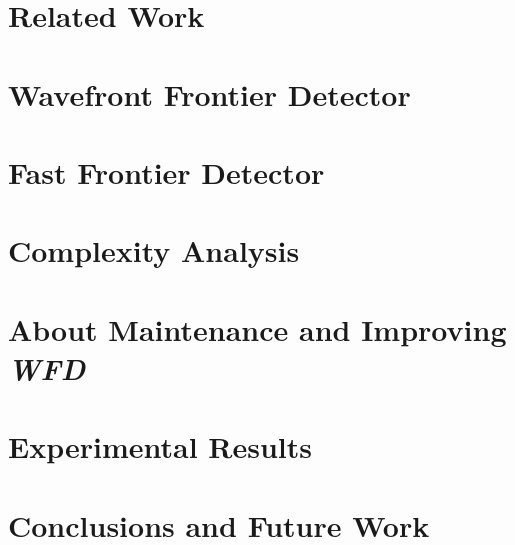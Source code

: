\documentclass[masters,oneside]{BIUCS}
\def\WFD{\emph{WFD}\xspace}
\begin{document}
\chapter{Related Work}
\label{chap:related_work}


\chapter{Wavefront Frontier Detector}
\label{chap:wfd}


\chapter{Fast Frontier Detector}
\label{chap:ffd}


\chapter{Complexity Analysis}
\label{chap:complexity}


\chapter{About Maintenance and Improving \WFD}
\label{chap:maintenance}


\chapter{Experimental Results}
\label{chap:results}


\chapter{Conclusions and Future Work}
\label{chap:conclusions}





 
 \nocite{*}
 



%
%



\end{document}
